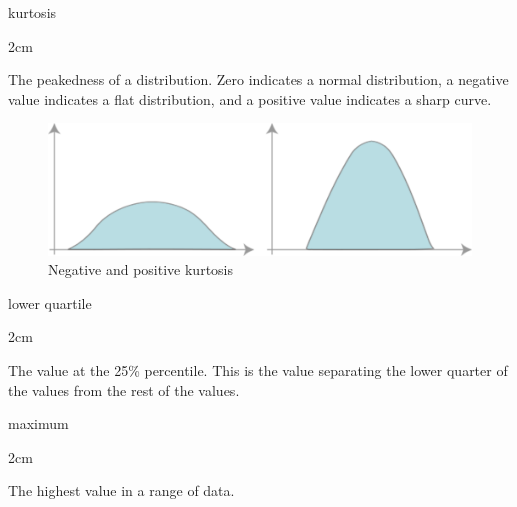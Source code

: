 \documentclass[
]{book}
\newenvironment{glsentry}
  {
  \begin{minipage}{\textwidth}
  }
  {
  \end{minipage}
  }
\newenvironment{glsterm}
  {
  \bfseries
  }
  {
  }
\newenvironment{glsdef}
  {
  \noindent
  \flushleft
  \begin{adjustwidth}{2cm}{}
  }
  {
  \end{adjustwidth}
  }
\theoremstyle{definition}
\theoremstyle{definition}
\theoremstyle{definition}
\theoremstyle{definition}
\theoremstyle{remark}
\begin{document}
\begin{glsentry}

\begin{glsterm}
kurtosis

\end{glsterm}

\begin{glsdef}

The peakedness of a distribution. Zero indicates a normal distribution, a negative value indicates a flat distribution, and a positive value indicates a sharp curve.

\begin{figure}[H]

{\centering \includegraphics[width=6.94in,]{Images/NonGenerated/Kurtosis} 

}

\caption{Negative and positive kurtosis}\label{fig:unnamed-chunk-53}
\end{figure}

\end{glsdef}

\end{glsentry}

\begin{glsentry}

\begin{glsterm}
lower quartile

\end{glsterm}

\begin{glsdef}
The value at the 25\% percentile. This is the value separating the lower quarter of the values from the rest of the values.

\end{glsdef}

\end{glsentry}

\begin{glsentry}

\begin{glsterm}
maximum

\end{glsterm}

\begin{glsdef}
The highest value in a range of data.

\end{glsdef}

\end{glsentry}
\end{document}

